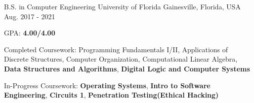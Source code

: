 

\begin{cventries}

  \cventry
    {B.S. in Computer Engineering} %
    {University of Florida} %
    {Gainesville, Florida, USA} %
    {Aug. 2017 - 2021} %
    {
      \begin{cvitems} %
        \item {GPA: \textbf{4.00/4.00}}
        \item {Completed Coursework: Programming Fundamentals I/II, Applications of Discrete Structures, Computer Organization, Computational Linear Algebra, \textbf{Data Structures and Algorithms}, \textbf{Digital Logic and Computer Systems}}
        \item {In-Progress Coursework: \textbf{Operating Systems}, \textbf{Intro to Software Engineering}, \textbf{Circuits 1}, \textbf{Penetration Testing(Ethical Hacking)}}
      \end{cvitems}
    }

\end{cventries}
